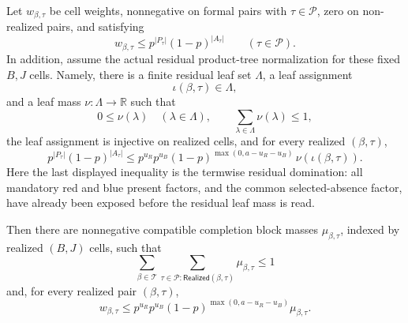 \begin{helper}
Let \(w_{\beta,\tau}\) be cell weights, nonnegative on formal pairs with
\(\tau\in\mathcal P\), zero on non-realized pairs, and satisfying
\[
w_{\beta,\tau}\le p^{|P_\tau|}(1-p)^{|A_\tau|}
\qquad(\tau\in\mathcal P).
\]
In addition, assume the actual residual product-tree normalization for these
fixed \(B,J\) cells.  Namely, there is a finite residual leaf set
\(\Lambda\), a leaf assignment
\[
\iota(\beta,\tau)\in\Lambda,
\]
and a leaf mass \(\nu:\Lambda\to\mathbb R\) such that
\[
0\le\nu(\lambda)\quad(\lambda\in\Lambda),\qquad
\sum_{\lambda\in\Lambda}\nu(\lambda)\le1,
\]
the leaf assignment is injective on realized cells, and for every realized
\((\beta,\tau)\),
\[
p^{|P_\tau|}(1-p)^{|A_\tau|}
\le
p^{u_R}p^{u_B}
(1-p)^{\max(0,a-u_R-u_B)}\,
\nu(\iota(\beta,\tau)).
\]
Here the last displayed inequality is the termwise residual domination: all
mandatory red and blue present factors, and the common selected-absence
factor, have already been exposed before the residual leaf mass is read.

Then there are nonnegative compatible completion block masses
\(\mu_{\beta,\tau}\), indexed by realized \((B,J)\) cells, such that
\[
\sum_{\beta\in\mathcal T}
  \sum_{\tau\in\mathcal P:\mathsf{Realized}(\beta,\tau)}
    \mu_{\beta,\tau}\le1
\]
and, for every realized pair \((\beta,\tau)\),
\[
w_{\beta,\tau}\le
p^{u_R}p^{u_B}
(1-p)^{\max(0,a-u_R-u_B)}\mu_{\beta,\tau}.
\]
\end{helper}
